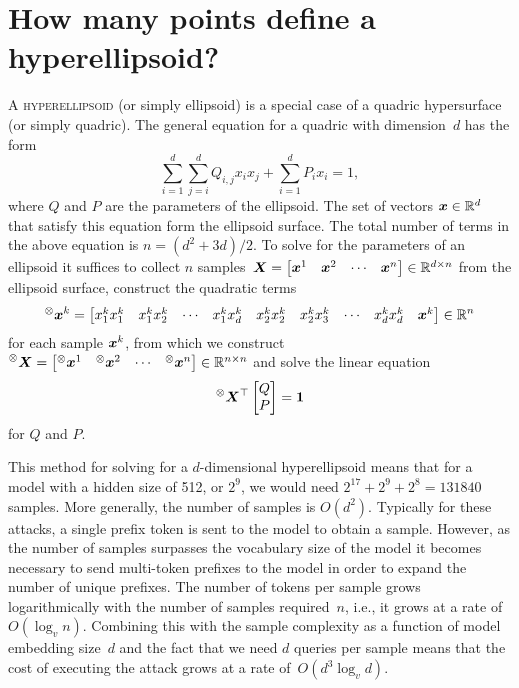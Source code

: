 \documentclass{article}
\begin{document}
\section{How many points define a hyperellipsoid?}
\lettrine{A}{ hyperellipsoid} (or simply ellipsoid) is a special case of a quadric hypersurface\footnotemark{} (or simply quadric).
The general equation for a quadric with dimension~\(d\) has the form 
\[\sum_{i=1}^d\sum_{j=i}^dQ_{i,j}x_ix_j + \sum_{i=1}^dP_ix_i=1,\]
where \(Q\) and \(P\) are the parameters of the ellipsoid.
The set of vectors \({\bm{x}}\in\mathbb{R}^d\) that satisfy this equation form the ellipsoid surface.
The total number of terms in the above equation is \(n=(d^2+3d)/2\).
To solve for the parameters of an ellipsoid 
it suffices to collect \(n\) samples~\(
{\bm{X}}=\begin{bmatrix}
{\bm{x}}^1&{\bm{x}}^2&\cdots&{\bm{x}}^n
\end{bmatrix}\in\mathbb{R}^{d\times n}
\) from the ellipsoid surface,
construct the quadratic terms 
\[
  \prescript{\otimes}{}{\bm{x}}^k = \begin{bmatrix}
  x^k_1x^k_1 & x^k_1x^k_2 & \cdots & x^k_1x^k_d & x^k_2x^k_2 & x^k_2x^k_3 & \cdots & x^k_dx^k_d & {\bm{x}}^k
\end{bmatrix}\in\mathbb{R}^n
\] for each sample \({\bm{x}}^k\), 
from which we construct \(\prescript\otimes{}{\bm{X}}=\begin{bmatrix}
  \prescript\otimes{}{\bm{x}}^1&\prescript\otimes{}{\bm{x}}^2&\cdots&\prescript\otimes{}{\bm{x}}^n
\end{bmatrix}\in\mathbb{R}^{n\times n}
\)
and solve the linear equation
\[
  \prescript\otimes{}{\bm{X}}^\top\begin{bmatrix}
    Q \\ P
  \end{bmatrix} 
  = \mathbf1 
\]
for \(Q\) and \(P\).\footnotemark{}

This method for solving for a \(d\)-dimensional hyperellipsoid means that for a model with a hidden size of 512, or \(2^9\), 
we would need \(2^{17} + 2^9 + 2^8=\num{131 840}\) samples. 
More generally, the number of samples is \(O(d^2)\).
Typically for these attacks, a single prefix token is sent to the model to obtain a sample. 
However, as the number of samples surpasses the vocabulary size of the model it becomes necessary to send multi-token prefixes to the model in order to expand the number of unique prefixes.
The number of tokens per sample grows logarithmically with the number of samples required~\(n\), i.e., it grows at a rate of \(O(\log_vn)\). 
Combining this with the sample complexity as a function of model embedding size~\(d\) and the fact that we need \(d\) queries per sample means that 
the cost of executing the attack grows at a rate of~\(O(d^3\log_vd)\).
\end{document}
